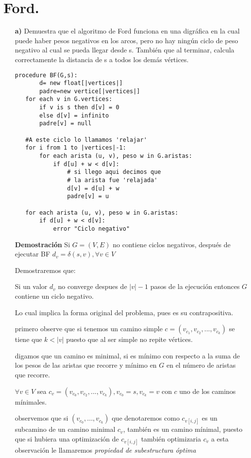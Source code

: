 \documentclass[12pt]{article}
\begin{document}
\section{Ford.}
\begin{itemize}
  \item[\bf{a)}] Demuestra que el algoritmo de Ford funciona en una digráfica en la cual puede haber pesos negativos en los arcos, pero no hay ningún ciclo de peso negativo al cual se pueda llegar desde s. También que al terminar, calcula correctamente la distancia de s a todos los demás vértices.

\begin{lstlisting}[frame=single] 
procedure BF(G,s):
       d= new float[|vertices|]
       padre=new vertice[|vertices|]
   for each v in G.vertices:
       if v is s then d[v] = 0
       else d[v] = infinito
       padre[v] = null
   
   #A este ciclo lo llamamos 'relajar'
   for i from 1 to |vertices|-1:
       for each arista (u, v), peso w in G.aristas:
           if d[u] + w < d[v]:
               # si llego aqui decimos que 
               # la arista fue 'relajada'
               d[v] = d[u] + w
               padre[v] = u

   for each arista (u, v), peso w in G.aristas:
       if d[u] + w < d[v]:
           error "Ciclo negativo"
\end{lstlisting}

\item[\bf{Demostración}]
  Si $G=(V,E)$ no contiene ciclos negativos, después de ejecutar BF $d_v=\delta(s,v), \forall v \in V$

  Demostraremos que:
  
  Si un valor $d_v$ no converge despues de $|v|-1$ pasos de la ejecución entonces $G$ contiene un ciclo negativo.
  
  Lo cual implica la forma original del problema, pues es su contrapositiva.

  primero observe que si tenemos un camino simple $c = (v_{c_1},v_{c_2},...,v_{c_k})$ se tiene que $k<|v|$ puesto que al ser simple no repite vértices.

  digamos que un camino es minimal, si es mínimo con respecto a la suma de los pesos de las aristas que recorre y mínimo en $G$ en el número de aristas que recorre.

  $\forall v \in V  $ sea $ c_v = (v_{c_0},v_{c_2},...,v_{c_k}), v_{c_0}=s, v_{c_k}=v $ con $c$ uno de los caminos mínimales.

  observemos que si $(v_{c_0},...,v_{c_k}) $ que denotaremos como $c_{v[i,j]}$ es un subcamino de un camino minimal $c_v$, también es un camino mínimal, puesto que si hubiera una optimización de  $c_{v[i,j]}$ también optimizaria $c_v$ a esta observación le llamaremos \emph{propiedad de subestructura óptima} 


\end{itemize}
\end{document}
